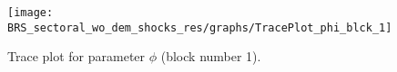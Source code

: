 \begin{figure}[H]
\centering
  \texttt{[image: BRS\_sectoral\_wo\_dem\_shocks\_res/graphs/TracePlot\_phi\_blck\_1]}\\
    \caption{Trace plot for parameter ${\phi}$ (block number 1).}
\end{figure}
